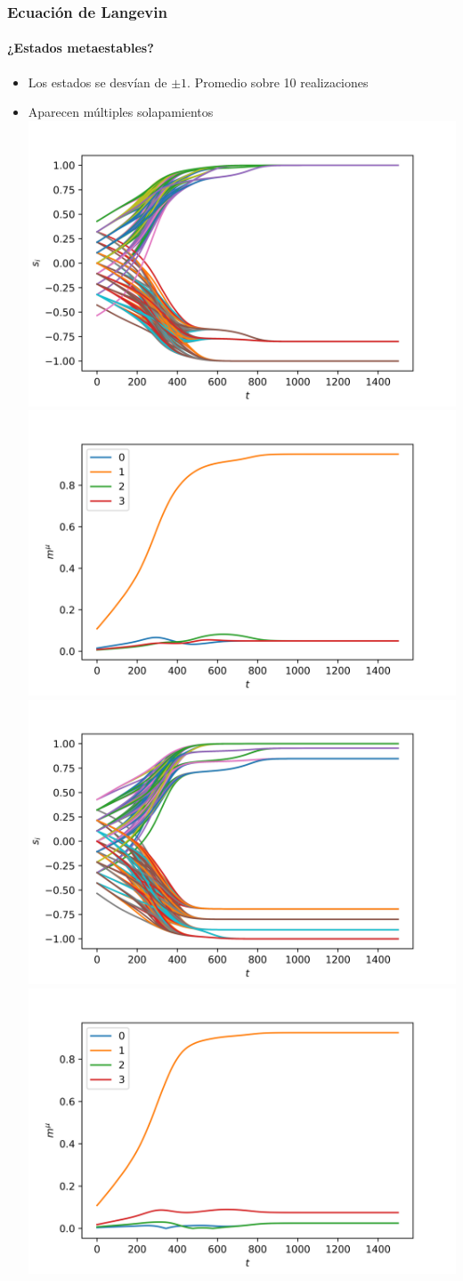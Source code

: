 \documentclass[11pt]{beamer}
\begin{document}
\begin{frame}
\frametitle{Ecuación de Langevin}
\framesubtitle{¿Estados metaestables?}
\begin{itemize}
	\item Los estados se desvían de $\pm 1$. Promedio sobre 10 realizaciones
	\item Aparecen múltiples solapamientos
	\includegraphics[width=0.45\linewidth]{spines_metaestable1_langevin.png}
	\includegraphics[width=0.45\linewidth]{overlap_metaestable1_langevin.png}
	\includegraphics[width=0.45\linewidth]{spines_metaestable2_langevin.png}
	\includegraphics[width=0.45\linewidth]{overlap_metaestable2_langevin.png}
\end{itemize}
\end{frame}
\end{document}

